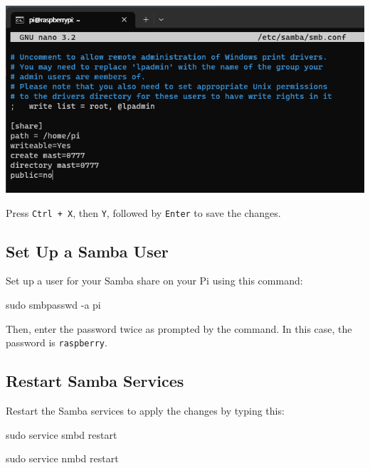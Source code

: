 \documentclass[
  letterpaper,
]{scrbook}
\newenvironment{Shaded}{\begin{snugshade}}{\end{snugshade}}
\newcommand{\AttributeTok}[1]{\textcolor[rgb]{0.40,0.45,0.13}{#1}}
\newcommand{\FunctionTok}[1]{\textcolor[rgb]{0.28,0.35,0.67}{#1}}
\newcommand{\NormalTok}[1]{\textcolor[rgb]{0.00,0.23,0.31}{#1}}
\begin{document}
\includegraphics{content/material/ch2/samba_setting.png}

Press \texttt{Ctrl\ +\ X}, then \texttt{Y}, followed by \texttt{Enter}
to save the changes.

\subsection{Set Up a Samba User}\label{set-up-a-samba-user}

Set up a user for your Samba share on your Pi using this command:

\begin{Shaded}
\begin{Highlighting}[]
\FunctionTok{sudo}\NormalTok{ smbpasswd }\AttributeTok{{-}a}\NormalTok{ pi}
\end{Highlighting}
\end{Shaded}

Then, enter the password twice as prompted by the command. In this case,
the password is \texttt{raspberry}.

\subsection{Restart Samba Services}\label{restart-samba-services}

Restart the Samba services to apply the changes by typing this:

\begin{Shaded}
\begin{Highlighting}[]
\FunctionTok{sudo}\NormalTok{ service smbd restart}
\end{Highlighting}
\end{Shaded}

\begin{Shaded}
\begin{Highlighting}[]
\FunctionTok{sudo}\NormalTok{ service nmbd restart}
\end{Highlighting}
\end{Shaded}
\end{document}
